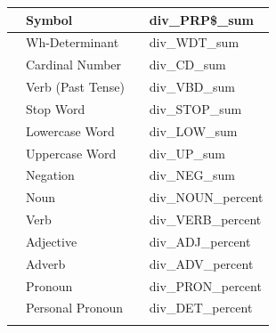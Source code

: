 \documentclass{article}
\begin{document}
\begin{appendices}
\begin{longtable}[c]{| >{\centering\arraybackslash}p{} | >{\centering\arraybackslash}p{} | >{\centering\arraybackslash}p{} | >{\centering\arraybackslash}p{} |}
                                   & Symbol                               &                           & div\_PRP\$\_sum             \\ \cline{2-2} \cline{4-4} 
                                   & Wh-Determinant                       &                           & div\_WDT\_sum               \\ \cline{2-2} \cline{4-4} 
                                   & Cardinal Number                      &                           & div\_CD\_sum                \\ \cline{2-2} \cline{4-4} 
                                   & Verb (Past Tense)                    &                           & div\_VBD\_sum               \\ \cline{2-2} \cline{4-4} 
                                   & Stop Word                            &                           & div\_STOP\_sum              \\ \cline{2-2} \cline{4-4} 
                                   & Lowercase Word                       &                           & div\_LOW\_sum               \\ \cline{2-2} \cline{4-4} 
                                   & Uppercase Word                       &                           & div\_UP\_sum                \\ \cline{2-2} \cline{4-4} 
                                   & Negation                             &                           & div\_NEG\_sum               \\ \cline{2-4} 
                                   & Noun                                 & \multirow{18}{*}{Percent} & div\_NOUN\_percent          \\ \cline{2-2} \cline{4-4} 
                                   & Verb                                 &                           & div\_VERB\_percent          \\ \cline{2-2} \cline{4-4} 
                                   & Adjective                            &                           & div\_ADJ\_percent           \\ \cline{2-2} \cline{4-4} 
                                   & Adverb                               &                           & div\_ADV\_percent           \\ \cline{2-2} \cline{4-4} 
                                   & Pronoun                              &                           & div\_PRON\_percent          \\ \cline{2-2} \cline{4-4} 
                                   & Personal Pronoun                     &                           & div\_DET\_percent           \\ \cline{2-2} \cline{4-4} 

\end{longtable}
\end{appendices}
\end{document}

